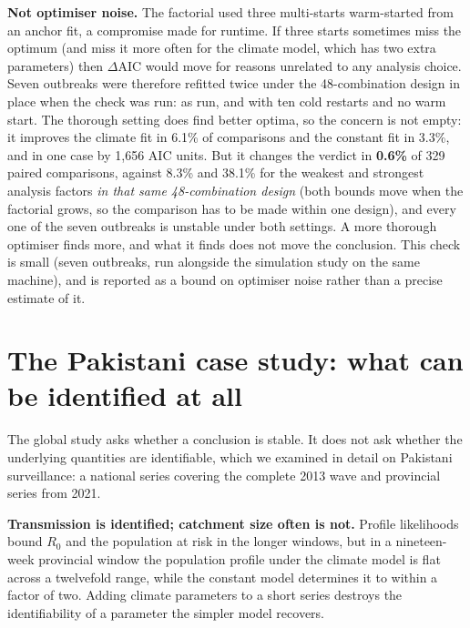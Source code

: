 \documentclass[11pt,a4paper]{article}
\begin{document}
\textbf{Not optimiser noise.} The factorial used three multi-starts warm-started
from an anchor fit, a compromise made for runtime. If three starts sometimes miss
the optimum (and miss it more often for the climate model, which has two extra
parameters) then $\Delta$AIC would move for reasons unrelated to any analysis
choice. Seven outbreaks were therefore refitted twice under the 48-combination
design in place when the check was run: as run, and with ten cold restarts and no
warm start. The thorough setting does
find better optima, so the concern is not empty: it improves the climate fit in
6.1\% of comparisons and the constant fit in 3.3\%, and in one case by 1{,}656 AIC
units. But it changes the verdict in \textbf{0.6\%} of 329 paired comparisons,
against 8.3\% and 38.1\% for the weakest and strongest analysis factors
\emph{in that same 48-combination design} (both bounds move when the factorial
grows, so the comparison has to be made within one design), and
every one of the seven outbreaks is unstable under both settings. A more thorough
optimiser finds more, and what it finds does not move the conclusion. This check
is small (seven outbreaks, run alongside the simulation study on the same
machine), and is reported as a bound on optimiser noise rather than a precise
estimate of it.

\section{The Pakistani case study: what can be identified at all}



The global study asks whether a conclusion is stable. It does not ask whether the
underlying quantities are identifiable, which we examined in detail on Pakistani
surveillance: a national series covering the complete 2013 wave and provincial
series from 2021.

\textbf{Transmission is identified; catchment size often is not.} Profile
likelihoods~\cite{raue} bound $R_0$ and the population at risk in the longer windows, but in a
nineteen-week provincial window the population profile under the climate model is
flat across a twelvefold range, while the constant model determines it to within a
factor of two. Adding climate parameters to a short series destroys the
identifiability of a parameter the simpler model recovers.
\end{document}
